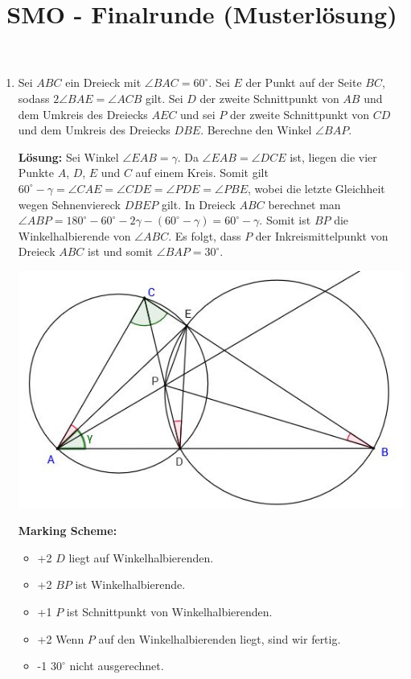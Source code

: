\documentclass[language=german,style=solution]{smo}
\title{SMO - Finalrunde (Musterlösung)}
\begin{document}
\begin{enumerate}[label=\textbf{\arabic*.}]

\item
Sei $ABC$ ein Dreieck mit $\angle BAC=60^\circ$. Sei $E$ der Punkt auf der Seite $BC$, sodass $2 \angle BAE=\angle ACB$ gilt. Sei $D$ der zweite Schnittpunkt von $AB$ und dem Umkreis des Dreiecks $AEC$ und sei $P$ der zweite Schnittpunkt von $CD$ und dem Umkreis des Dreiecks $DBE$.
Berechne den Winkel $\angle BAP$.

\textbf{Lösung:} Sei Winkel $\angle EAB=\gamma$. Da $\angle EAB = \angle DCE$ ist, liegen die vier Punkte $A$, $D$, $E$ und $C$ auf einem Kreis. Somit gilt $60^\circ-\gamma = \angle CAE=\angle CDE = \angle PDE=\angle PBE$, wobei die letzte Gleichheit wegen Sehnenviereck $DBEP$ gilt. In Dreieck $ABC$ berechnet man $\angle ABP=180^\circ -60^\circ -2\gamma-(60^\circ-\gamma)=60^\circ -\gamma$. Somit ist $BP$ die Winkelhalbierende von $\angle ABC$. Es folgt, dass $P$ der Inkreismittelpunkt von Dreieck $ABC$ ist und somit $\angle BAP=30^\circ$.
	
\includegraphics{geometrie_1_finalrunde_16_zwei}

\textbf{Marking Scheme:}
\begin{itemize}
\item  +2 $D$ liegt auf Winkelhalbierenden.
\item +2 $BP$ ist Winkelhalbierende.
\item +1 $P$ ist Schnittpunkt von Winkelhalbierenden.
\item +2 Wenn $P$ auf den Winkelhalbierenden liegt, sind wir fertig.
\item -1 $30^\circ$ nicht ausgerechnet. 
\end{itemize}
	

\end{enumerate}
\end{document}
